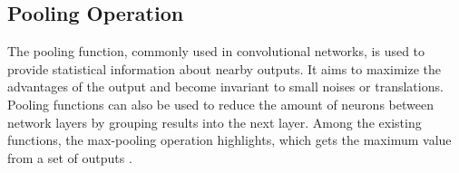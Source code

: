 \subsection{Pooling Operation}
\label{cap2_pooling}

The pooling function, commonly used in convolutional networks, is used to provide statistical information about nearby outputs.
It aims to maximize the advantages of the output and become invariant to small noises or translations.
Pooling functions can also be used to reduce the amount of neurons between network layers by grouping results into the next layer. 
Among the existing functions, the max-pooling operation highlights, which gets the maximum value from a set of outputs \cite[Ch. 9]{Goodfellow2016}.
